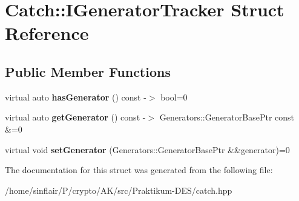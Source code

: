 \hypertarget{structCatch_1_1IGeneratorTracker}{}\section{Catch\+:\+:I\+Generator\+Tracker Struct Reference}
\label{structCatch_1_1IGeneratorTracker}
\subsection*{Public Member Functions}
\begin{DoxyCompactItemize}
\item 
\mbox{\label{structCatch_1_1IGeneratorTracker_ae88084f9af27c8b9a5d5775b9c148498}} 
virtual auto {\bfseries has\+Generator} () const -\/$>$ bool=0
\item 
\mbox{\label{structCatch_1_1IGeneratorTracker_a23be942fc51672598bfa02c678c3078a}} 
virtual auto {\bfseries get\+Generator} () const -\/$>$ Generators\+::\+Generator\+Base\+Ptr const \&=0
\item 
\mbox{\label{structCatch_1_1IGeneratorTracker_a9945eff42219edc5a7071eebd8b0419e}} 
virtual void {\bfseries set\+Generator} (Generators\+::\+Generator\+Base\+Ptr \&\&generator)=0
\end{DoxyCompactItemize}


The documentation for this struct was generated from the following file\+:\begin{DoxyCompactItemize}
\item 
/home/sinflair/\+P/crypto/\+A\+K/src/\+Praktikum-\/\+D\+E\+S/catch.\+hpp\end{DoxyCompactItemize}
